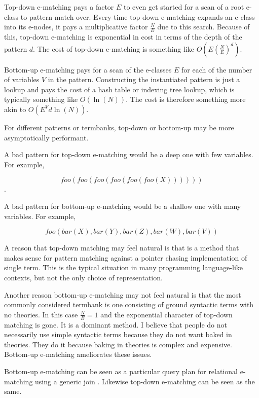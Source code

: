 \documentclass[sigconf]{acmart}
\begin{document}
Top-down e-matching pays a factor $E$ to even get started for a scan of a root e-class to pattern match over. Every time top-down e-matching expands an e-class into its e-nodes, it pays a multiplicative factor $\frac{N}{E}$ due to this search. Because of this, top-down e-matching is exponential in cost in terms of the depth of the pattern $d$. The cost of top-down e-matching is something like $O(E(\frac{N}{E})^d)$.

Bottom-up e-matching pays for a scan of the e-classes $E$ for each of the number of variables $V$ in the pattern. Constructing the instantiated pattern is just a lookup and pays the cost of a hash table or indexing tree lookup, which is typically something like $O(\ln(N))$. The cost is therefore something more akin to $O(E^V d \ln(N) )$.

For different patterns or termbanks, top-down or bottom-up may be more asymptotically performant.

A bad pattern for top-down e-matching would be a deep one with few variables. For example, 

$$foo(foo(foo(foo(foo(foo(X))))))$$.

A bad pattern for bottom-up e-matching would be a shallow one with many variables. For example,

$$foo(bar(X), bar(Y), bar(Z), bar(W), bar(V))$$



A reason that top-down matching may feel natural is that is a method that makes sense for pattern matching against a pointer chasing implementation of single term. This is the typical situation in many programming language-like contexts, but not the only choice of representation.

Another reason bottom-up e-matching may not feel natural is that the most commonly considered termbank is one consisting of ground syntactic terms with no theories. In this case $\frac{N}{E} = 1$ and the exponential character of top-down matching is gone. It is a dominant method. I believe that people do not necessarily use simple syntactic terms because they do not want baked in theories. They do it because baking in theories is complex and expensive. Bottom-up e-matching ameliorates these issues.

Bottom-up e-matching can be seen as a particular query plan for relational e-matching using a generic join \cite{wang2023freejoinunifyingworstcase}. Likewise top-down e-matching can be seen as the same. 
\end{document}
